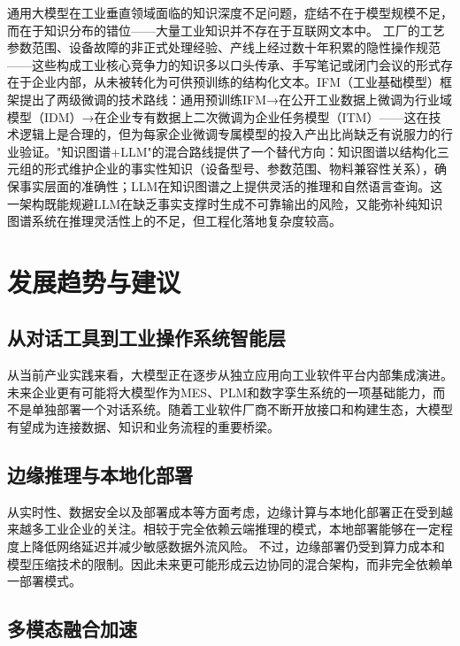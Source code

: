 \documentclass[12pt,a4paper]{ctexart}
\begin{document}
通用大模型在工业垂直领域面临的知识深度不足问题，症结不在于模型规模不足，而在于知识分布的错位——大量工业知识并不存在于互联网文本中。\cite{ieee2024llmindustrial} 工厂的工艺参数范围、设备故障的非正式处理经验、产线上经过数十年积累的隐性操作规范——这些构成工业核心竞争力的知识多以口头传承、手写笔记或闭门会议的形式存在于企业内部，从未被转化为可供预训练的结构化文本。IFM（工业基础模型）框架提出了两级微调的技术路线：通用预训练IFM→在公开工业数据上微调为行业域模型（IDM）→在企业专有数据上二次微调为企业任务模型（ITM）\cite{jms2025ifm}——这在技术逻辑上是合理的，但为每家企业微调专属模型的投入产出比尚缺乏有说服力的行业验证。"知识图谱+LLM"的混合路线提供了一个替代方向：知识图谱以结构化三元组的形式维护企业的事实性知识（设备型号、参数范围、物料兼容性关系），确保事实层面的准确性；LLM在知识图谱之上提供灵活的推理和自然语言查询。这一架构既能规避LLM在缺乏事实支撑时生成不可靠输出的风险，又能弥补纯知识图谱系统在推理灵活性上的不足，但工程化落地复杂度较高。

\section{发展趋势与建议}

\subsection{从对话工具到工业操作系统智能层}

从当前产业实践来看，大模型正在逐步从独立应用向工业软件平台内部集成演进。未来企业更有可能将大模型作为MES、PLM和数字孪生系统的一项基础能力，而不是单独部署一个对话系统。随着工业软件厂商不断开放接口和构建生态，大模型有望成为连接数据、知识和业务流程的重要桥梁。\cite{siemens2024xcelerator}

\subsection{边缘推理与本地化部署}

从实时性、数据安全以及部署成本等方面考虑，边缘计算与本地化部署正在受到越来越多工业企业的关注。相较于完全依赖云端推理的模式，本地部署能够在一定程度上降低网络延迟并减少敏感数据外流风险。\cite{jms2025ifm} 不过，边缘部署仍受到算力成本和模型压缩技术的限制。因此未来更可能形成云边协同的混合架构，而非完全依赖单一部署模式。\cite{huawei2025pangu}


\subsection{多模态融合加速}
\end{document}
